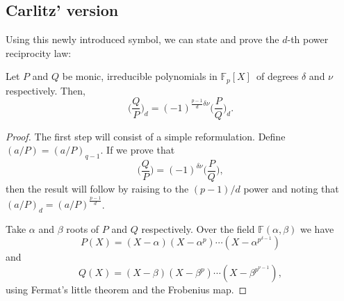 \subsection{Carlitz' version}

Using this newly introduced symbol, we can state and prove the ${d}$-th power reciprocity law:
\begin{theorem}
  Let ${P}$ and ${Q}$ be monic, irreducible polynomials in ${\mathbb{F}_{p}[X]}$ of degrees ${\delta}$ and ${\nu}$ respectively. Then,
  \begin{equation}
    \bigg( \frac{Q}{P} \bigg)_{d} = (-1)^{\frac{p-1}{d}\delta \nu} \bigg( \frac{P}{Q} \bigg)_{d}.
  \end{equation}
  
  \begin{proof}
    The first step will consist of a simple reformulation. Define ${(a/P)=(a/P)_{q-1}}$. If we prove that
    \begin{equation}
      \bigg( \frac{Q}{P} \bigg) = (-1)^{\delta \nu} \bigg( \frac{P}{Q} \bigg),
    \end{equation}
    then the result will follow by raising to the ${(p-1)/d}$ power and noting that ${(a/P)_{d}=(a/P)^{\frac{p-1}{d}}}$.
    
    Take ${\alpha}$ and ${\beta}$ roots of ${P}$ and ${Q}$ respectively. Over the field ${\mathbb{F}(\alpha,\beta)}$ we have
    \begin{equation}
      P(X)=(X-\alpha)(X - \alpha^{p}) \cdots (X-\alpha^{p^{\delta-1}})
    \end{equation}
    and
    \begin{equation}
      Q(X)=(X-\beta)(X-\beta^{p}) \cdots (X-\beta^{p^{\nu-1}}),
    \end{equation}
    using Fermat's little theorem and the Frobenius map.
    

\end{proof}
\end{theorem}
